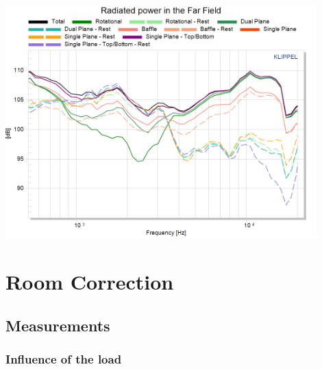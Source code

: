 \documentclass{report}
\begin{document}
\begin{appendices}
\begin{center}
	\includegraphics[width=0.9\textwidth]{Appendix/Rad_Pow_BnO_ZoomHF}
    \captionsetup{hypcap=false}
    \label{Curves:2way}
\end{center}


\section{Room Correction}

\subsection{Measurements}

\subsubsection{Influence of the load}
\label{Curves:InfluLoad}


\end{appendices}
\end{document}
